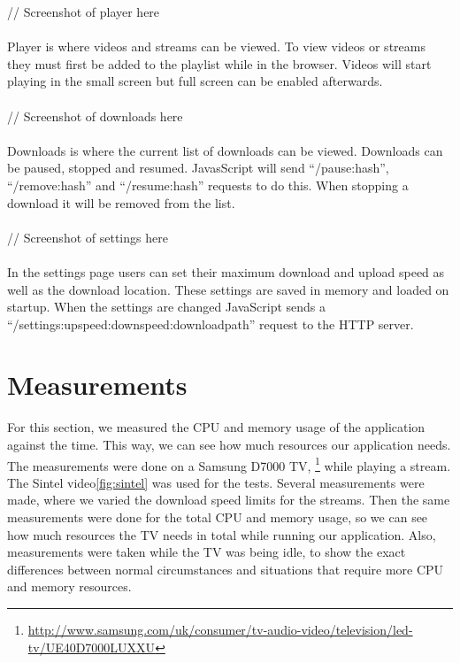 // Screenshot of player here
\\\\
Player is where videos and streams can be viewed. To view videos or streams they must first be added to the playlist while in the browser. Videos will start playing in the small screen but full screen can be enabled afterwards.
\\\\
// Screenshot of downloads here
\\\\
Downloads is where the current list of downloads can be viewed. Downloads can be paused, stopped and resumed. JavasScript will send ``/pause:hash'', ``/remove:hash'' and ``/resume:hash'' requests to do this.
When stopping a download it will be removed from the list.
\\\\
// Screenshot of settings here
\\\\
In the settings page users can set their maximum download and upload speed as well as the download location. These settings are saved in memory and loaded on startup. 
When the settings are changed JavaScript sends a ``/settings:upspeed:downspeed:downloadpath'' request to the HTTP server.

\section{Measurements}
For this section, we measured the CPU and memory usage of the application against the time.
This way, we can see how much resources our application needs. The measurements were done on a Samsung D7000
TV, \footnote{\url{http://www.samsung.com/uk/consumer/tv-audio-video/television/led-tv/UE40D7000LUXXU}} while playing a stream.
The Sintel video\ref{fig:sintel} was used for the tests. Several measurements were made, where we varied the download speed limits for the streams.
Then the same measurements were done for the total CPU and memory usage, so we can see how much resources the TV needs in total while running
our application. Also, measurements were taken while the TV was being idle, to show the exact differences between normal circumstances and situations
that require more CPU and memory resources.

